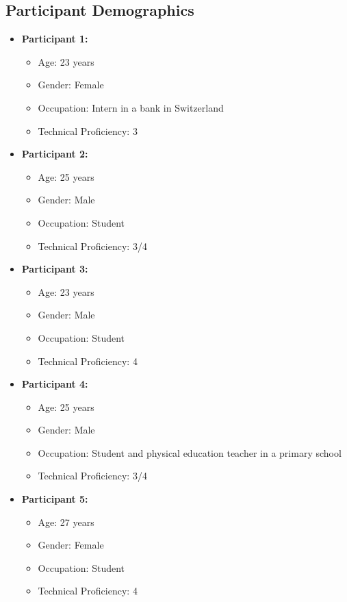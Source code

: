 \documentclass{article}
\begin{document}
\subsection{Participant Demographics}
\begin{itemize}
    \item \textbf{Participant 1:}
    \begin{itemize}
        \item Age: 23 years
        \item Gender: Female
        \item Occupation: Intern in a bank in Switzerland
        \item Technical Proficiency: 3
    \end{itemize}
    \item \textbf{Participant 2:}
    \begin{itemize}
        \item Age: 25 years
        \item Gender: Male
        \item Occupation: Student
        \item Technical Proficiency: 3/4
    \end{itemize}
    \item \textbf{Participant 3:}
    \begin{itemize}
        \item Age: 23 years
        \item Gender: Male
        \item Occupation: Student
        \item Technical Proficiency: 4
    \end{itemize}
    \item \textbf{Participant 4:}
    \begin{itemize}
        \item Age: 25 years
        \item Gender: Male
        \item Occupation: Student and physical education teacher in a primary school
        \item Technical Proficiency: 3/4
    \end{itemize}
        \item \textbf{Participant 5:}
    \begin{itemize}
        \item Age: 27 years
        \item Gender: Female
        \item Occupation: Student
        \item Technical Proficiency: 4
    \end{itemize}
\end{itemize}
\end{document}
